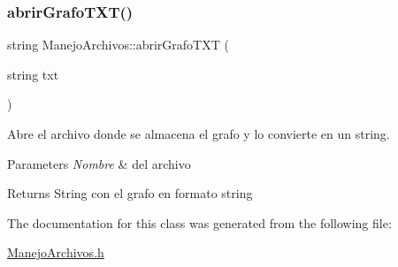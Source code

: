 \subsubsection{\texorpdfstring{abrir\+Grafo\+T\+X\+T()}{abrirGrafoTXT()}}
{\footnotesize\ttfamily string Manejo\+Archivos\+::abrir\+Grafo\+T\+XT (\begin{DoxyParamCaption}\item[{string}]{txt }\end{DoxyParamCaption})\hspace{0.3cm}{\ttfamily [inline]}}



Abre el archivo donde se almacena el grafo y lo convierte en un string. 


\begin{DoxyParams}{Parameters}
{\em Nombre} & del archivo \\
\hline
\end{DoxyParams}
\begin{DoxyReturn}{Returns}
String con el grafo en formato string 
\end{DoxyReturn}


The documentation for this class was generated from the following file\+:\begin{DoxyCompactItemize}
\item 
\hyperlink{ManejoArchivos_8h}{Manejo\+Archivos.\+h}\end{DoxyCompactItemize}
